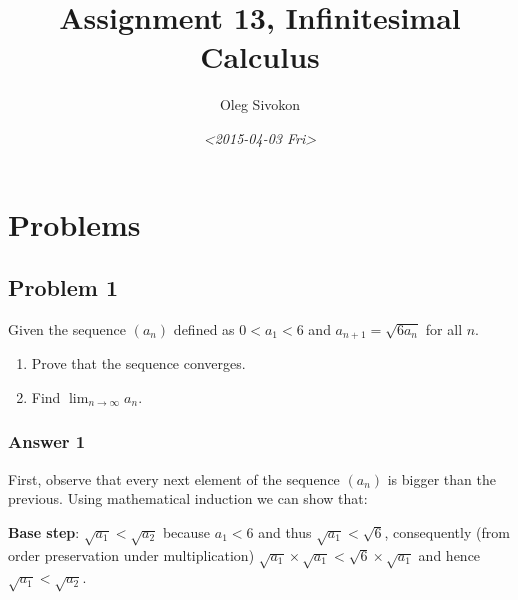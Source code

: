 \documentclass[11pt]{article}
\author{Oleg Sivokon}
\date{\textit{<2015-04-03 Fri>}}
\title{Assignment 13, Infinitesimal Calculus}
\begin{document}
\maketitle
\tableofcontents



\clearpage

\section{Problems}
\label{sec-1}

\subsection{Problem 1}
\label{sec-1-1}
Given the sequence $(a_n)$ defined as $0 < a_1 < 6$ and $a_{n+1} = \sqrt{6a_n}$
for all $n$.
\begin{enumerate}
\item Prove that the sequence converges.
\item Find $\lim_{n \to \infty} a_n$.
\end{enumerate}

\subsubsection{Answer 1}
\label{sec-1-1-1}
First, observe that every next element of the sequence $(a_n)$ is bigger than
the previous.  Using mathematical induction we can show that:

\textbf{Base step}: $\sqrt{a_1} < \sqrt{a_2}$ because $a_1 < 6$ and thus
$\sqrt{a_1} < \sqrt{6}$, consequently (from order preservation under multiplication)
$\sqrt{a_1} \times \sqrt{a_1} < \sqrt{6} \times \sqrt{a_1}$ and hence
$\sqrt{a_1} < \sqrt{a_2}$.
\end{document}
